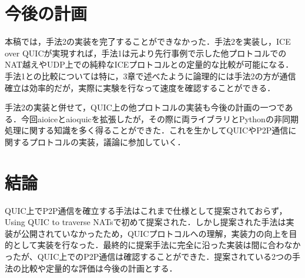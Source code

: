 \section{今後の計画}
本稿では，手法2の実装を完了することができなかった．手法2を実装し，ICE over QUICが実現すれば，手法1は元より先行事例で示した他プロトコルでのNAT越えやUDP上での純粋なICEプロトコルとの定量的な比較が可能になる．手法1との比較については特に，3章で述べたように論理的には手法2の方が通信確立は効率的だが，実際に実験を行なって速度を確認することができる．

手法2の実装と併せて，QUIC上の他プロトコルの実装も今後の計画の一つである．今回aioiceとaioquicを拡張したが，その際に両ライブラリとPythonの非同期処理に関する知識を多く得ることができた．これを生かしてQUICやP2P通信に関するプロトコルの実装，議論に参加していく．

\section{結論}
QUIC上でP2P通信を確立する手法はこれまで仕様として提案されておらず，Using QUIC to traverse NATsで初めて提案された．しかし提案された手法は実装が公開されていなかったため，QUICプロトコルへの理解，実装力の向上を目的として実装を行なった．最終的に提案手法に完全に沿った実装は間に合わなかったが、QUIC上でのP2P通信は確認することができた．提案されている2つの手法の比較や定量的な評価は今後の計画とする．
